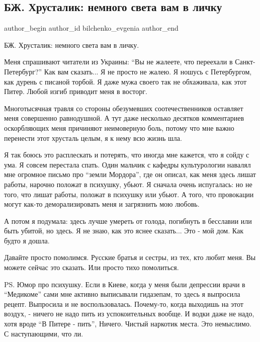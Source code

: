  
 
 
 
 
\subsection{БЖ. Хрусталик: немного света вам в личку}
\label{sec:23_12_2021.tg.bilchenko_evgenia.1.piter}

\ifcmt
 author_begin
   author_id bilchenko_evgenia
 author_end
\fi

БЖ. Хрусталик: немного света вам в личку.

Меня спрашивают читатели из Украины: \enquote{Вы не жалеете, что переехали в
Санкт-Петербург?} Как вам сказать... Я не просто не жалею. Я ношусь с
Петербургом, как дурень с писаной торбой. Я даже мужа своего так не обхаживала,
как этот Питер. Любой изгиб приводит меня в восторг. 


Многотысячная травля со стороны обезумевших соотечественников оставляет меня
совершенно равнодушной. А тут даже несколько десятков комментариев оскорбляющих
меня причиняют неимоверную боль, потому что мне важно перенести этот хрусталь
целым, я к нему всю жизнь шла. 

Я так боюсь это расплескать и потерять, что иногда мне кажется, что я сойду с
ума. Я совсем перестала спать. Один мальчик с кафедры культурологии навалял мне
огромное письмо про \enquote{земли Мордора}, где он описал, как меня здесь лишат
работы, нарочно положат в психушку, убьют. Я сначала очень испугалась: но не
того, что лишат работы, положат в психушку или убьют. А того, что провокации
могут как-то деморализировать меня и загрязнить мою любовь.

А потом я подумала: здесь лучше умереть от голода, погибнуть в бесславии или
быть убитой, но здесь. Я не знаю, как это яснее сказать... Это - мой дом. Как
будто я дошла. 

Давайте просто помолимся. Русские братья и сестры, из тех, кто любит меня. Вы
можете сейчас это сказать. Или просто тихо помолиться. 

PS. Юмор про психушку. Если в Киеве, когда у меня были депрессии врачи в
\enquote{Медикоме} сами мне активно выписывали гидазепам, то здесь я выпросила рецепт.
Выпросила и не воспользовалась. Почему-то, когда выходишь на этот воздух, -
ничего не надо пить из успокоительных вообще. И водки даже не надо, хотя вроде
\enquote{В Питере - пить}, Ничего. Чистый наркотик места. Это немыслимо. С
наступающими, что ли.
